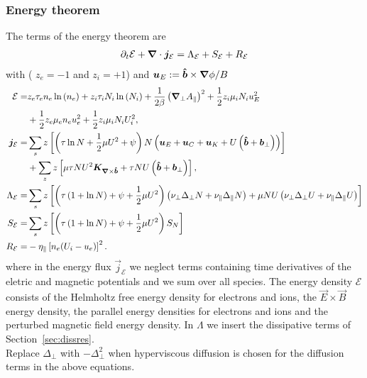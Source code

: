 \subsubsection{Energy theorem}
The terms of the energy theorem are
\begin{align} \label{eq:energy_theorem}
\partial_t \mathcal E +
{\boldsymbol{\nabla}}\cdot {\boldsymbol{j}}_{\mathcal E}
= \Lambda_{\mathcal E}
+  S_{\mathcal E}
+  R_{\mathcal E}
\end{align}
with ( $z_e=-1$ and $z_i=+1$) and ${\boldsymbol{u}}_E := {\bm{\hat{b}}\times {\boldsymbol{\nabla}}\phi}/{B}$
\begin{align} \label{eq:energy_conservation}
  \mathcal{E}= & z_e\tau_e n_e \ln{(n_e)} +z_i\tau_i N_i\ln{(N_i)}
  +\frac{1}{2\beta}\left({\boldsymbol{\nabla}}_{\perp} A_\parallel\right)^2
   +  \frac{1}{2} z_i \mu_i N_i u_E^2  \nonumber\\
   & +\frac{1}{2} z_e\mu_e  n_e u_e^2
  +\frac{1}{2} z_i\mu_i  N_i U_i^2,\\
  {\boldsymbol{j}}_{\mathcal E} =& \sum_s z\left[
  \left(\tau \ln N + \frac{1}{2}\mu U^2 + \psi \right)N\left(
  {\boldsymbol{u}}_E + {\boldsymbol{u}}_C + {\boldsymbol{u}}_{K} +U\left(\bm{\hat{b}}+{{\boldsymbol{b}}}_\perp\right)  \right) \right]
  \nonumber\\
  &+ \sum_z z\left[\mu \tau NU^2{\boldsymbol{K}}_{{\boldsymbol{\nabla}}\times\bm{\hat{b}}} + \tau NU \left(\bm{\hat{b}} + {{\boldsymbol{b}}}_\perp\right)\right], \\
  \Lambda_{\mathcal E} =&  \sum_s z\left[\left( \tau\left( 1+\ln{N}\right) + \psi + \frac{1}{2} \mu U^2 \right)
  \left(\nu_\perp\Delta_\perp N + \nu_\parallel\Delta_\parallel N\right)  +  \mu NU\left(\nu_\perp\Delta_\perp U + \nu_\parallel\Delta_\parallel U\right) \right]
\nonumber \\
  S_{\mathcal E} =&  \sum_s  z\left[ \left(\tau\left( 1+\ln{N}\right) +\psi + \frac{1}{2} \mu U^2 \right)S_{N}\right]
\nonumber \\
  R_{\mathcal E} =&  -\eta_\parallel  \left[ n_e(U_i-u_e)\right]^2.
\end{align}
where in the energy flux $\vec j_{\mathcal E}$
we neglect terms  containing time derivatives
of the eletric and magnetic potentials and we sum over all species.
The energy density $\mathcal E$ consists of the Helmholtz free energy density for electrons and ions,
the \(\vec{E} \times \vec{B}\) energy density, the parallel energy densities for electrons and ions and the perturbed magnetic field energy density.
In \(\Lambda\) we insert the dissipative terms of Section~\ref{sec:dissres}. \\
Replace $\Delta_\perp$ with $-\Delta_\perp^2$ when hyperviscous diffusion is chosen
for the diffusion terms in the above equations.

